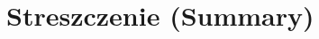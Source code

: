 \documentclass[12pt]{mwbk}
\theoremstyle{plain}
\theoremstyle{definition}
\theoremstyle{remark}
\begin{document}
\chapter*{Streszczenie (Summary)}

\bigskip
\bigskip

\begin{center}
  \textbf{\tytul}
\end{center}



\bigskip

\begin{center}
  \textbf{\textit{\tytulangielski}}
\end{center}



{\it

}
\end{document}
